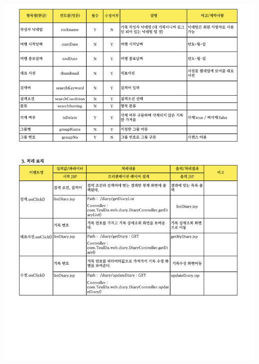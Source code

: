 {{{{{{{{{{{{{{{{\includegraphics[width=20cm]{./Figure/Analysis/Display/diary/diary_15.pdf} \\
}}}}}}}}}}}}}}}}
